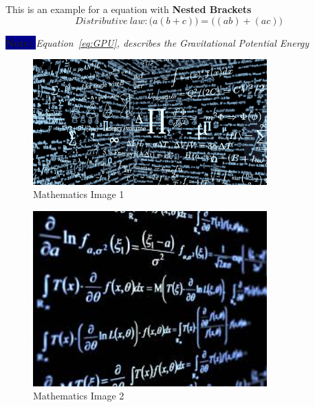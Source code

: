 \documentclass{article}
\begin{document}
This is an example for a equation with \textbf{\textcolor{RoyalPurple}{Nested Brackets}}
\begin{equation}
 Distributive \ law : \bigg(  a (b+c) \bigg) = \bigg( (ab) + (ac) \bigg) \nonumber
\end{equation} 

\textbf{\colorbox{darkBlue}{\textcolor{faintBlue}{Note: }}} \textit{Equation~\ref{eq:GPU}, describes the Gravitational Potential Energy}  

\begin{figure}[h]                                               %
    \centering
    \includegraphics[width=9cm]{Math-1.jpg}
    \caption{Mathematics Image 1}
    \label{fig:math-1}
\end{figure}
\begin{figure}[h]
    \centering
    \includegraphics[width=9cm]{Math-2.jpg}
    \caption{Mathematics Image 2}
    \label{fig:math-2}
\end{figure}






\clearpage
\end{document}
